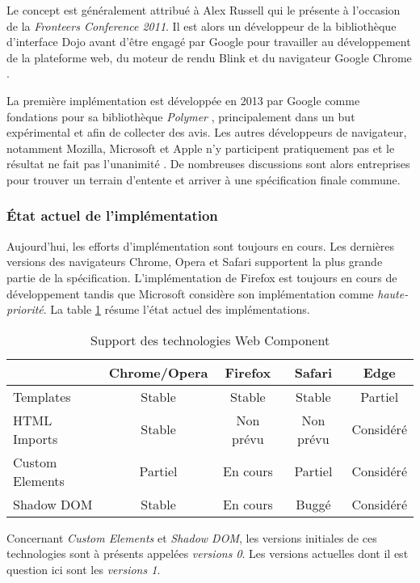 Le concept est généralement attribué à Alex Russell \cite{russell2011} qui le présente à l'occasion de la \emph{Fronteers Conference 2011}. Il est alors un développeur de la bibliothèque d'interface Dojo avant d'être engagé par Google pour travailler au développement de la plateforme web, du moteur de rendu Blink et du navigateur Google Chrome \cite{russellIN}.

La première implémentation est développée en 2013 par Google comme fondations pour sa bibliothèque \emph{Polymer} \cite{polymer-project}, principalement dans un but expérimental et afin de collecter des avis. Les autres développeurs de navigateur, notamment Mozilla, Microsoft et Apple n'y participent pratiquement pas et le résultat ne fait pas l'unanimité \cite{stateOfWebComp}. De nombreuses discussions sont alors entreprises pour trouver un terrain d'entente et arriver à une spécification finale commune.

\subsubsection{État actuel de l'implémentation}

Aujourd'hui, les efforts d'implémentation sont toujours en cours. Les dernières versions des navigateurs Chrome, Opera et Safari supportent la plus grande partie de la spécification. L'implémentation de Firefox est toujours en cours de développement tandis que Microsoft considère son implémentation comme \emph{haute-priorité}. La table \ref{tab:webcomp-support} résume l'état actuel des implémentations.

\begin{table}[h]
	\centering
	\caption{Support des technologies Web Component}
	\label{tab:webcomp-support}
	\begin{tabular}{@{}lcccc@{}}
		\toprule
		& Chrome/Opera & Firefox   & Safari  & Edge      \\ \midrule
		Templates       & Stable         & Stable    & Stable    & Partiel   \\
		HTML Imports    & Stable         & Non prévu & Non prévu & Considéré \\
		Custom Elements & Partiel        & En cours  & Partiel   & Considéré \\
		Shadow DOM      & Stable         & En cours  & Buggé   & Considéré \\ \bottomrule
	\end{tabular}
\end{table}

Concernant \emph{Custom Elements} et \emph{Shadow DOM}, les versions initiales de ces technologies sont à présents appelées \emph{versions 0}. Les versions actuelles dont il est question ici sont les \emph{versions 1}.

